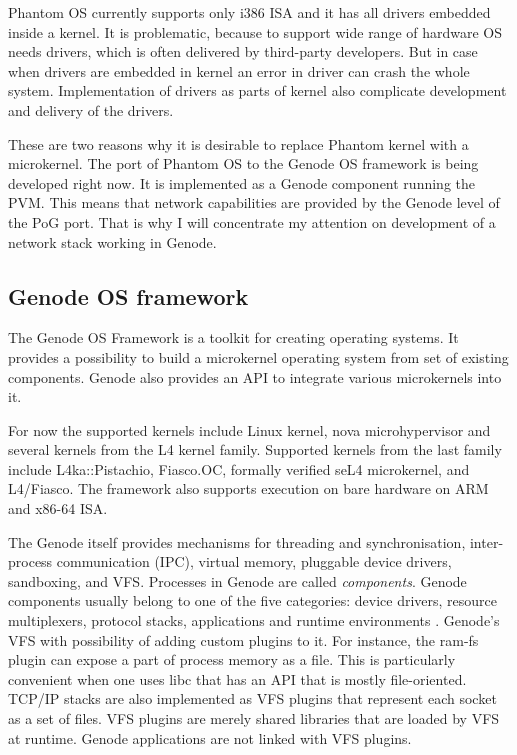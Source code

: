 Phantom OS currently supports only i386 ISA and it has all drivers embedded 
inside a kernel. It is problematic, because to support wide range of hardware
OS needs drivers, which is often delivered by third-party developers. But in
case when drivers are embedded in kernel an error in driver can crash the whole
system. Implementation of drivers as parts of kernel also complicate
development and delivery of the drivers.

These are two reasons why it is desirable to replace Phantom kernel with a
microkernel. The port of Phantom OS to the Genode OS framework is being
developed right now. It is implemented as a Genode component running the PVM.
This means that network capabilities are provided by the Genode level of the
PoG port.  That is why I will concentrate my attention on development of a
network stack working in Genode.

\subsection{Genode OS framework} 
The Genode OS Framework \cite{genode_foundations} is a toolkit for creating 
operating systems. It provides a possibility to build a microkernel operating
system from set of existing components. Genode also provides an API to
integrate various microkernels into it.

For now the supported kernels include Linux kernel, nova microhypervisor and
several kernels from the L4 kernel family. Supported kernels from the last
family include L4ka::Pistachio, Fiasco.OC, formally verified seL4 microkernel,
and L4/Fiasco.  The framework also supports execution on bare hardware on ARM
and x86-64 ISA.

The Genode itself provides mechanisms for threading and synchronisation,
inter-process communication (IPC), virtual memory, pluggable device drivers,
sandboxing, and VFS. Processes in Genode are called \textit{components}. Genode
components usually belong to one of the five categories: device drivers,
resource multiplexers, protocol stacks, applications and runtime environments
\cite{genode_foundations}. Genode's VFS with possibility of adding custom
plugins to it. For instance, the ram-fs plugin can expose a part of process
memory as a file. This is particularly convenient when one uses libc that has
an API that is mostly file-oriented. TCP/IP stacks are also implemented as VFS
plugins that represent each socket as a set of files. VFS plugins are merely
shared libraries that are loaded by VFS at runtime. Genode applications are not
linked with VFS plugins.

